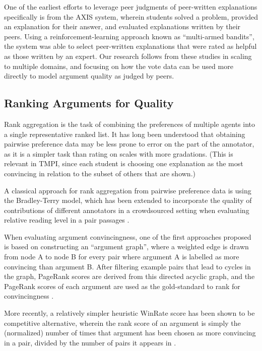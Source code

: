 \documentclass[notitlepage,12pt]{jedm}
\begin{document}
One of the earliest efforts to leverage peer judgments of peer-written 
explanations specifically is from the AXIS system\cite{williams_axis:_2016}, 
wherein students solved a problem, provided an explanation for their answer, 
and evaluated explanations written by their peers.
Using a reinforcement-learning approach known as ``multi-armed bandits'', the 
system was able to select peer-written explanations that were rated as helpful 
as those written by an expert.
Our research follows from these studies in scaling to multiple domains, and 
focusing on how the vote data can be used more directly to model argument 
quality as judged by peers.

\subsection{Ranking Arguments for Quality}
Rank aggregation is the task of combining the preferences of multiple agents 
into a single representative ranked list.
It has long been understood that obtaining pairwise preference data may be 
less prone to error on the part of the annotator, as it is a simpler task than 
rating on scales with more gradations. 
(This is relevant in TMPI, since each student is choosing one explanation as 
the most convincing in relation to the subset of others that are shown.)

A classical approach for rank aggregation from pairwise preference data is 
using the Bradley-Terry model, which has been extended to incorporate the 
quality of contributions of different annotators in a crowdsourced setting when 
evaluating relative reading level in a pair passages \cite{chen_pairwise_2013}. 

When evaluating argument convincingness, one of the first approaches proposed 
is based on constructing an ``argument graph'', where a weighted edge is drawn 
from node A to node B for every pair where argument A is labelled as more 
convincing than argument B. 
After filtering example pairs that lead to cycles in the graph, PageRank scores 
are derived from this directed acyclic graph, and the PageRank 
scores of each argument are used as the gold-standard to rank for 
convincingness \cite{habernal_which_2016}.

More recently, a relatively simpler heuristic WinRate score has been shown to 
be competitive alternative, wherein the rank score of an argument is simply the 
(normalized) number of times that argument has been chosen as more convincing 
in a pair, divided by the number of pairs it appears in
\cite{potash_ranking_2019}.
\end{document}
